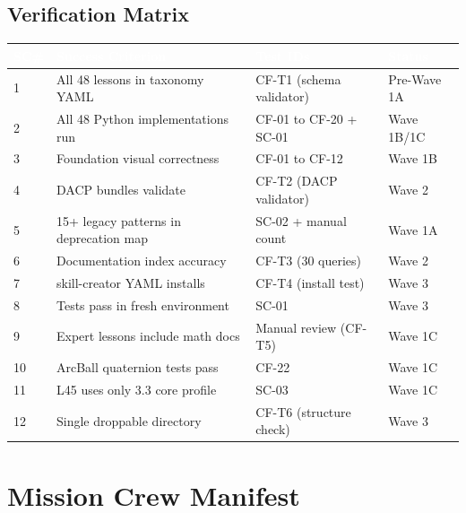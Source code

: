 \documentclass[11pt,letterpaper]{article}
\newcommand{\tableheader}[1]{\textbf{\sffamily\textcolor{white}{#1}}}
\begin{document}
\subsection{Verification Matrix}

\begin{center}
\begin{tabularx}{\textwidth}{L{1cm}L{5cm}L{3.5cm}L{1.5cm}}
\toprule
{}
\tableheader{SC\#} & \tableheader{Success Criterion} & \tableheader{Test IDs} & \tableheader{Status} \\
 & All 48 lessons in taxonomy YAML & CF-T1 (schema validator) & Pre-Wave 1A \\
2 & All 48 Python implementations run & CF-01 to CF-20 + SC-01 & Wave 1B/1C \\
3 & Foundation visual correctness & CF-01 to CF-12 & Wave 1B \\
4 & DACP bundles validate & CF-T2 (DACP validator) & Wave 2 \\
5 & 15+ legacy patterns in deprecation map & SC-02 + manual count & Wave 1A \\
6 & Documentation index accuracy & CF-T3 (30 queries) & Wave 2 \\
7 & skill-creator YAML installs & CF-T4 (install test) & Wave 3 \\
8 & Tests pass in fresh environment & SC-01 & Wave 3 \\
9 & Expert lessons include math docs & Manual review (CF-T5) & Wave 1C \\
10 & ArcBall quaternion tests pass & CF-22 & Wave 1C \\
11 & L45 uses only 3.3 core profile & SC-03 & Wave 1C \\
12 & Single droppable directory & CF-T6 (structure check) & Wave 3 \\
\bottomrule
\end{tabularx}
\end{center}

\section{Mission Crew Manifest}
\end{document}
